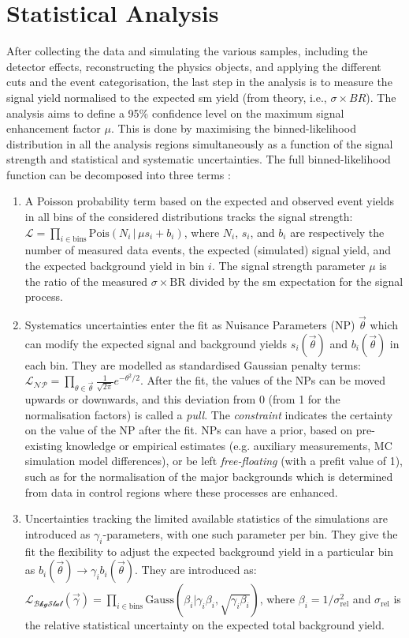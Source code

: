 
\section{Statistical Analysis}\label{sec-fitFramework}
After collecting the data and simulating the various samples, including the detector effects, reconstructing the physics objects, and applying the different cuts and the event categorisation, the last step in the analysis is to measure the signal yield normalised to the expected \gls{sm} yield (from theory, i.e., $\sigma \times BR$). The analysis aims to define a 95\% confidence level on the maximum signal enhancement factor $\mu$. This is done by maximising the binned-likelihood distribution in all the analysis regions simultaneously as a function of the signal strength and statistical and systematic uncertainties. The full binned-likelihood function can be decomposed into three terms \cite{Mironova:2837159}: 
\begin{enumerate}
\item A Poisson probability term based on the expected and observed event yields in all bins of the considered distributions tracks the signal strength: $\mathcal{L} = \prod_{i\in \textrm{bins}} \textrm{Pois}(N_i \,|\, \mu s_i + b_i)$, where $N_i$, $s_i$, and $b_i$ are respectively the number of measured data events, the expected (simulated) signal yield, and the expected background yield in bin $i$. The signal strength parameter $\mu$ is the ratio of the measured $\sigma \times \textrm{BR}$ divided by the \gls{sm} expectation for the signal process.  
\item Systematics uncertainties enter the fit as Nuisance Parameters (NP) $\overrightarrow{\theta}$ which can modify the expected signal and background yields $s_i(\overrightarrow{\theta})$ and $b_i(\overrightarrow{\theta})$ in each bin. They are modelled as standardised Gaussian penalty terms: $\mathcal{L_{\textrm{NP}}} = \prod_{\theta \in \overrightarrow{\theta}} \frac{1}{\sqrt{2\pi}} e^{- \theta^2/2}$. After the fit, the values of the NPs can be moved upwards or downwards, and this deviation from 0 (from 1 for the normalisation factors) is called a \textit{pull}. The \textit{constraint} indicates the certainty on the value of the NP after the fit. NPs can have a prior, based on pre-existing knowledge or empirical estimates (e.g. auxiliary measurements, MC simulation model differences), or be left \textit{free-floating} (with a prefit value of 1), such as for the normalisation of the major backgrounds which is determined from data in control regions where these processes are enhanced. 
\item Uncertainties tracking the limited available statistics of the simulations are introduced as $\gamma_i$-parameters, with one such parameter per bin. They give the fit the flexibility to adjust the expected background yield in a particular bin as $b_i(\overrightarrow{\theta}) \rightarrow \gamma_i b_i(\overrightarrow{\theta})$. They are introduced as: $\mathcal{L_{\textrm{BkgStat}}}(\overrightarrow{\gamma}) = \prod_{i \in \textrm{bins}} \textrm{Gauss}(\beta_i | \gamma_i \beta_i, \sqrt{\gamma_i \beta_i})$, where $\beta_i = 1 / \sigma^2_\textrm{rel}$ and $\sigma_\textrm{rel}$ is the relative statistical uncertainty on the expected total background yield. 
\end{enumerate} 
